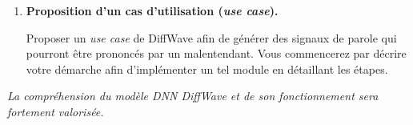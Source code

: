 \documentclass[11pt,a4paper]{article}
\begin{document}
\begin{enumerate}[label=\alph*.]
\item \textbf{Proposition d'un cas d'utilisation (\textit{use case}).}

Proposer un \textit{use case} de DiffWave afin de générer des signaux de
parole qui pourront être prononcés par un malentendant. Vous commencerez
par décrire votre démarche afin d'implémenter un tel module en détaillant
les étapes.

\end{enumerate}

\vspace{1em}
\begin{center}
    \textit{La compréhension du modèle DNN DiffWave et de son fonctionnement
    sera fortement valorisée.}
\end{center}
\end{document}
